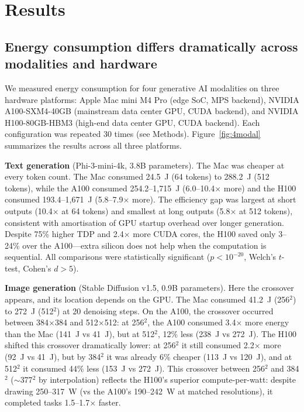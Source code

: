 \documentclass[11pt]{article}
\begin{document}
\section{Results}

\subsection{Energy consumption differs dramatically across modalities and hardware}

We measured energy consumption for four generative AI modalities on three hardware platforms: Apple Mac mini M4 Pro (edge SoC, MPS backend), NVIDIA A100-SXM4-40GB (mainstream data center GPU, CUDA backend), and NVIDIA H100-80GB-HBM3 (high-end data center GPU, CUDA backend). Each configuration was repeated 30 times (see Methods). Figure~\ref{fig:4modal} summarizes the results across all three platforms.

\textbf{Text generation} (Phi-3-mini-4k\cite{abdin2024phi3}, 3.8B parameters). The Mac was cheaper at every token count. The Mac consumed 24.5~J (64 tokens) to 288.2~J (512 tokens), while the A100 consumed 254.2--1,715~J (6.0--10.4$\times$ more) and the H100 consumed 193.4--1,671~J (5.8--7.9$\times$ more). The efficiency gap was largest at short outputs (10.4$\times$ at 64 tokens) and smallest at long outputs (5.8$\times$ at 512 tokens), consistent with amortisation of GPU startup overhead over longer generation. Despite 75\% higher TDP and 2.4$\times$ more CUDA cores, the H100 saved only 3--24\% over the A100---extra silicon does not help when the computation is sequential. All comparisons were statistically significant ($p < 10^{-20}$, Welch's $t$-test, Cohen's $d > 5$).

\textbf{Image generation} (Stable Diffusion v1.5\cite{rombach2022high}, 0.9B parameters). Here the crossover appears, and its location depends on the GPU. The Mac consumed 41.2~J (256$^2$) to 272~J (512$^2$) at 20 denoising steps. On the A100, the crossover occurred between 384$\times$384 and 512$\times$512: at 256$^2$, the A100 consumed 3.4$\times$ more energy than the Mac (141~J vs 41~J), but at 512$^2$, 12\% less (238~J vs 272~J). The H100 shifted this crossover dramatically lower: at 256$^2$ it still consumed 2.2$\times$ more (92~J vs 41~J), but by 384$^2$ it was already 6\% cheaper (113~J vs 120~J), and at 512$^2$ it consumed 44\% less (153~J vs 272~J). This crossover between 256$^2$ and 384$^2$ ($\sim$377$^2$ by interpolation) reflects the H100's superior compute-per-watt: despite drawing 250--317~W (vs the A100's 190--242~W at matched resolutions), it completed tasks 1.5--1.7$\times$ faster.
\end{document}
